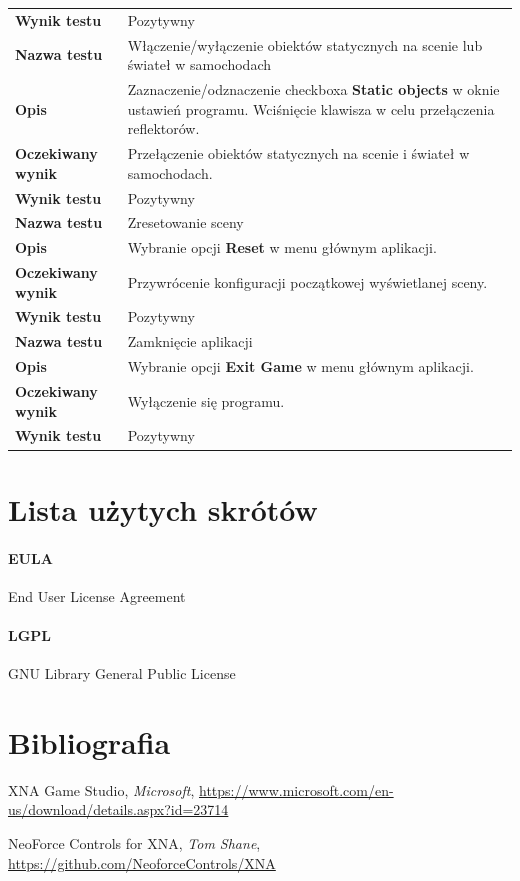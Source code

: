 \documentclass[10pt,a4paper]{article}
\begin{document}
\begin{tabularx}{\textwidth}{|l|X|}
	\hline
	\textbf{Wynik testu} & Pozytywny \\
	\hhline{==}
	\textbf{Nazwa testu} & Włączenie/wyłączenie obiektów statycznych na scenie lub świateł w samochodach \\
	\hline
	\textbf{Opis} & Zaznaczenie/odznaczenie checkboxa \textbf{Static objects} w oknie ustawień programu. Wciśnięcie klawisza \keystroke{L} w celu przełączenia reflektorów. \\
	\hline
	\textbf{Oczekiwany wynik} & Przełączenie obiektów statycznych na scenie i świateł w samochodach. \\
	\hline
	\textbf{Wynik testu} & Pozytywny \\
	\hhline{==}
	\textbf{Nazwa testu} & Zresetowanie sceny \\
	\hline
	\textbf{Opis} & Wybranie opcji \textbf{Reset} w menu głównym aplikacji. \\
	\hline
	\textbf{Oczekiwany wynik} & Przywrócenie konfiguracji początkowej wyświetlanej sceny. \\
	\hline
	\textbf{Wynik testu} & Pozytywny \\
	\hhline{==}
	\textbf{Nazwa testu} & Zamknięcie aplikacji \\
	\hline
	\textbf{Opis} & Wybranie opcji \textbf{Exit Game} w menu głównym aplikacji. \\
	\hline
	\textbf{Oczekiwany wynik} & Wyłączenie się programu. \\
	\hline
	\textbf{Wynik testu} & Pozytywny \\
	\hline
\end{tabularx}

\newpage
\section{Lista użytych skrótów}
\label{abbr:eula}
\paragraph{EULA} End User License Agreement

\label{abbr:lgpl}
\paragraph{LGPL} GNU Library General Public License

\renewcommand*{\refname}{\vspace*{-2em}}
\section{Bibliografia}
\begin{thebibliography}{99}
		XNA Game Studio,
		\emph{Microsoft},
		\url{https://www.microsoft.com/en-us/download/details.aspx?id=23714}

		NeoForce Controls for XNA,
		\emph{Tom Shane},
		\url{https://github.com/NeoforceControls/XNA}
\end{thebibliography}
\end{document}
